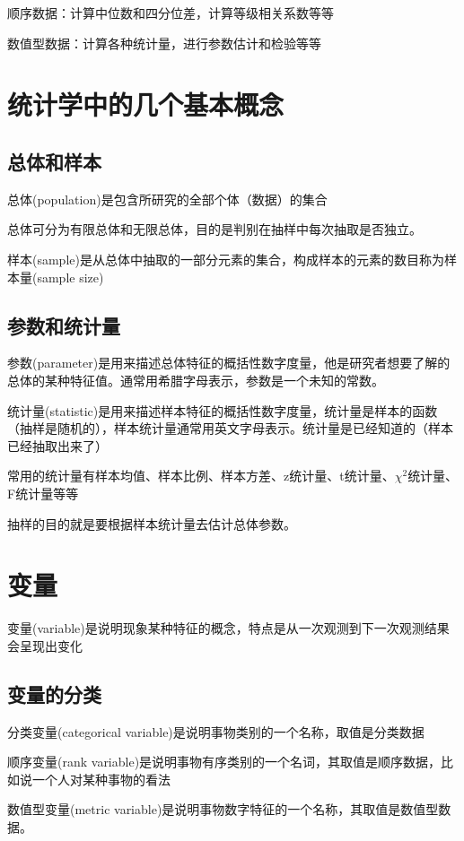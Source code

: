 \documentclass[UTF8,10pt]{book}
\begin{document}
    顺序数据：计算中位数和四分位差，计算等级相关系数等等

    数值型数据：计算各种统计量，进行参数估计和检验等等
    
    \section{统计学中的几个基本概念}
    \subsection{总体和样本}
    总体(population)是包含所研究的全部个体（数据）的集合

    总体可分为有限总体和无限总体，目的是判别在抽样中每次抽取是否独立。

    样本(sample)是从总体中抽取的一部分元素的集合，构成样本的元素的数目称为样本量(sample size)

    \subsection{参数和统计量}
    参数(parameter)是用来描述总体特征的概括性数字度量，他是研究者想要了解的总体的某种特征值。通常用希腊字母表示，参数是一个未知的常数。

    统计量(statistic)是用来描述样本特征的概括性数字度量，统计量是样本的函数（抽样是随机的），样本统计量通常用英文字母表示。统计量是已经知道的（样本已经抽取出来了）

    常用的统计量有样本均值、样本比例、样本方差、z统计量、t统计量、$\chi^2$统计量、F统计量等等

    抽样的目的就是要根据样本统计量去估计总体参数。

    \section{变量}
    变量(variable)是说明现象某种特征的概念，特点是从一次观测到下一次观测结果会呈现出变化

    \subsection{变量的分类}
    分类变量(categorical variable)是说明事物类别的一个名称，取值是分类数据

    顺序变量(rank variable)是说明事物有序类别的一个名词，其取值是顺序数据，比如说一个人对某种事物的看法

    数值型变量(metric variable)是说明事物数字特征的一个名称，其取值是数值型数据。
\end{document}
